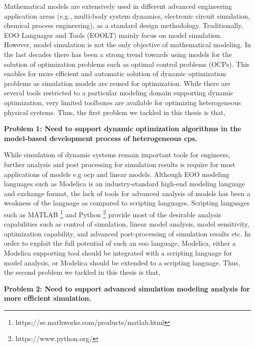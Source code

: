 Mathematical models are extensively used in different advanced engineering application areas (e.g., multi-body system dynamics, electronic circuit simulation, chemical process engineering), as a standard design methodology. Traditionally, EOO Languages and Tools (EOOLT) mainly focus on model simulation. However, model simulation is not the only objective of mathematical modeling. In the last decades there has been a strong trend towards using models for the solution of optimization problems such as optimal control problems (OCPs). This enables for more efficient and automatic solution of dynamic optimization problems as simulation models are reused for optimization. While there are several tools restricted to a particular modeling domain supporting dynamic optimization, very limited toolboxes are available for optimizing heterogeneous physical systems. Thus, the first problem we tackled in this thesis is that, 

\begin{description}
	
\item \textbf{Problem 1: Need to support dynamic optimization algorithms in the model-based development process of heterogeneous \acrshort{cps}.}

\end{description}

While simulation of dynamic systems remain important tools for engineers, further analysis and post processing for simulation results is require for most applications of models e.g \acrshort{ocp} and linear models. Although EOO modeling languages such as Modelica is an industry-standard high-end modeling language and exchange format, the lack of tools for advanced analysis of models has been a weakness of the language as compared to scripting languages. Scripting languages such as MATLAB \footnote{https://se.mathworks.com/products/matlab.html} and Python \footnote{https://www.python.org/} provide most of the desirable analysis capabilities such as control of simulation, linear model analysis, model sensitivity, optimization capability, and advanced post-processing of simulation results etc. In order to exploit the full potential of such an \acrshort{eoo} language, Modelica, either a Modelica supporting tool should be integrated with a scripting language for model analysis, or Modelica should be extended to a scripting language. Thus, the second problem we tackled in this thesis is that,

\begin{description}

\item \textbf{Problem 2: Need to support advanced simulation modeling analysis for more efficient simulation.}

\end{description}

